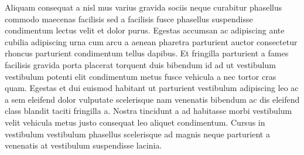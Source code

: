 \par
Aliquam consequat a nisl mus varius gravida sociis neque curabitur phasellus commodo maecenas facilisis sed a facilisis fusce phasellus suspendisse condimentum lectus velit et dolor purus. Egestas accumsan ac adipiscing ante cubilia adipiscing urna cum arcu a aenean pharetra parturient auctor consectetur rhoncus parturient condimentum tellus dapibus. Et fringilla parturient a fames facilisis gravida porta placerat torquent duis bibendum id ad ut vestibulum vestibulum potenti elit condimentum metus fusce vehicula a nec tortor cras quam. Egestas et dui euismod habitant ut parturient vestibulum adipiscing leo ac a sem eleifend dolor vulputate scelerisque nam venenatis bibendum ac dis eleifend class blandit taciti fringilla a. Nostra tincidunt a ad habitasse morbi vestibulum velit vehicula metus justo consequat leo aliquet condimentum. Cursus in vestibulum vestibulum phasellus scelerisque ad magnis neque parturient a venenatis at vestibulum suspendisse lacinia.


